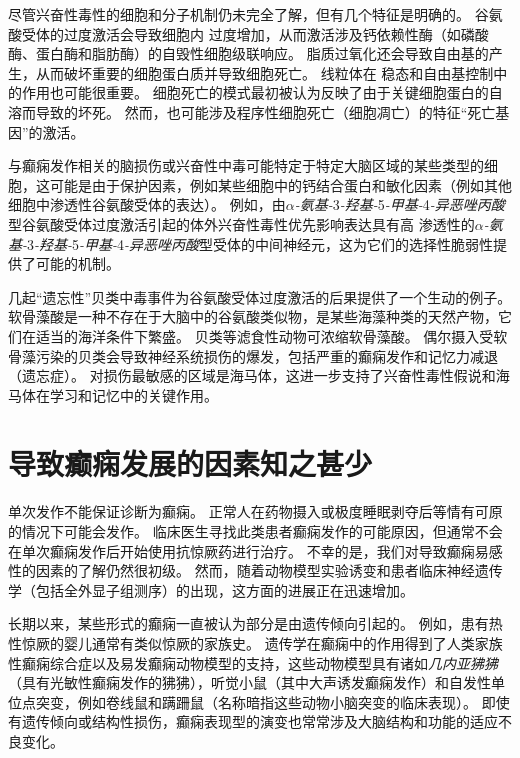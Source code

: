 尽管兴奋性毒性的细胞和分子机制仍未完全了解，但有几个特征是明确的。
谷氨酸受体的过度激活会导致细胞内  过度增加，从而激活涉及钙依赖性酶（如磷酸酶、蛋白酶和脂肪酶）的自毁性细胞级联响应。
脂质过氧化还会导致自由基的产生，从而破坏重要的细胞蛋白质并导致细胞死亡。
线粒体在  稳态和自由基控制中的作用也可能很重要。
细胞死亡的模式最初被认为反映了由于关键细胞蛋白的自溶而导致的坏死。
然而，也可能涉及程序性细胞死亡（细胞凋亡）的特征“死亡基因”的激活。


与癫痫发作相关的脑损伤或兴奋性中毒可能特定于特定大脑区域的某些类型的细胞，这可能是由于保护因素，例如某些细胞中的钙结合蛋白和敏化因素（例如其他细胞中渗透性谷氨酸受体的表达）。
例如，由\textit{$\alpha$-氨基-}3\textit{-羟基-}5\textit{-甲基-}4\textit{-异恶唑丙酸}型谷氨酸受体过度激活引起的体外兴奋性毒性优先影响表达具有高  渗透性的\textit{$\alpha$-氨基-}3\textit{-羟基-}5\textit{-甲基-}4\textit{-异恶唑丙酸}型受体的中间神经元，这为它们的选择性脆弱性提供了可能的机制。


几起“遗忘性”贝类中毒事件为谷氨酸受体过度激活的后果提供了一个生动的例子。
软骨藻酸是一种不存在于大脑中的谷氨酸类似物，是某些海藻种类的天然产物，它们在适当的海洋条件下繁盛。
贝类等滤食性动物可浓缩软骨藻酸。
偶尔摄入受软骨藻污染的贝类会导致神经系统损伤的爆发，包括严重的癫痫发作和记忆力减退（遗忘症）。
对损伤最敏感的区域是海马体，这进一步支持了兴奋性毒性假说和海马体在学习和记忆中的关键作用。



\section{导致癫痫发展的因素知之甚少}

单次发作不能保证诊断为癫痫。
正常人在药物摄入或极度睡眠剥夺后等情有可原的情况下可能会发作。
临床医生寻找此类患者癫痫发作的可能原因，但通常不会在单次癫痫发作后开始使用抗惊厥药进行治疗。
不幸的是，我们对导致癫痫易感性的因素的了解仍然很初级。
然而，随着动物模型实验诱变和患者临床神经遗传学（包括全外显子组测序）的出现，这方面的进展正在迅速增加。


长期以来，某些形式的癫痫一直被认为部分是由遗传倾向引起的。
例如，患有热性惊厥的婴儿通常有类似惊厥的家族史。
遗传学在癫痫中的作用得到了人类家族性癫痫综合症以及易发癫痫动物模型的支持，这些动物模型具有诸如\textit{几内亚狒狒}（具有光敏性癫痫发作的狒狒），听觉小鼠（其中大声诱发癫痫发作）和自发性单位点突变，例如卷线鼠和蹒跚鼠（名称暗指这些动物小脑突变的临床表现）。
即使有遗传倾向或结构性损伤，癫痫表现型的演变也常常涉及大脑结构和功能的适应不良变化。



